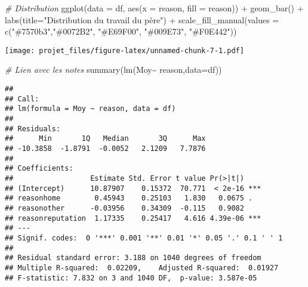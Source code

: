 \documentclass[
]{article}
\newenvironment{Shaded}{\begin{snugshade}}{\end{snugshade}}
\newcommand{\AttributeTok}[1]{\textcolor[rgb]{0.77,0.63,0.00}{#1}}
\newcommand{\CommentTok}[1]{\textcolor[rgb]{0.56,0.35,0.01}{\textit{#1}}}
\newcommand{\FunctionTok}[1]{\textcolor[rgb]{0.00,0.00,0.00}{#1}}
\newcommand{\NormalTok}[1]{#1}
\newcommand{\SpecialCharTok}[1]{\textcolor[rgb]{0.00,0.00,0.00}{#1}}
\newcommand{\StringTok}[1]{\textcolor[rgb]{0.31,0.60,0.02}{#1}}
\begin{document}
\begin{Shaded}
\begin{Highlighting}[]
\CommentTok{\# Distribution}
\FunctionTok{ggplot}\NormalTok{(}\AttributeTok{data =}\NormalTok{ df, }\FunctionTok{aes}\NormalTok{(}\AttributeTok{x =}\NormalTok{ reason, }\AttributeTok{fill =}\NormalTok{ reason)) }\SpecialCharTok{+}
  \FunctionTok{geom\_bar}\NormalTok{() }\SpecialCharTok{+}
  \FunctionTok{labs}\NormalTok{(}\AttributeTok{title=}\StringTok{"Distribution du travail du père"}\NormalTok{) }\SpecialCharTok{+}
  \FunctionTok{scale\_fill\_manual}\NormalTok{(}\AttributeTok{values =} \FunctionTok{c}\NormalTok{(}\StringTok{"\#7570b3"}\NormalTok{,}\StringTok{"\#0072B2"}\NormalTok{, }\StringTok{"\#E69F00"}\NormalTok{, }\StringTok{"\#009E73"}\NormalTok{, }\StringTok{"\#F0E442"}\NormalTok{))}
\end{Highlighting}
\end{Shaded}

\texttt{[image: projet\_files/figure-latex/unnamed-chunk-7-1.pdf]}

\begin{Shaded}
\begin{Highlighting}[]
\CommentTok{\# Lien avec les notes}
\FunctionTok{summary}\NormalTok{(}\FunctionTok{lm}\NormalTok{(Moy}\SpecialCharTok{\textasciitilde{}}\NormalTok{ reason,}\AttributeTok{data=}\NormalTok{df))}
\end{Highlighting}
\end{Shaded}

\begin{verbatim}
## 
## Call:
## lm(formula = Moy ~ reason, data = df)
## 
## Residuals:
##      Min       1Q   Median       3Q      Max 
## -10.3858  -1.8791  -0.0052   2.1209   7.7876 
## 
## Coefficients:
##                  Estimate Std. Error t value Pr(>|t|)    
## (Intercept)      10.87907    0.15372  70.771  < 2e-16 ***
## reasonhome        0.45943    0.25103   1.830   0.0675 .  
## reasonother      -0.03956    0.34309  -0.115   0.9082    
## reasonreputation  1.17335    0.25417   4.616 4.39e-06 ***
## ---
## Signif. codes:  0 '***' 0.001 '**' 0.01 '*' 0.05 '.' 0.1 ' ' 1
## 
## Residual standard error: 3.188 on 1040 degrees of freedom
## Multiple R-squared:  0.02209,    Adjusted R-squared:  0.01927 
## F-statistic: 7.832 on 3 and 1040 DF,  p-value: 3.587e-05
\end{verbatim}

\begin{Shaded}
\end{Shaded}
\end{document}
